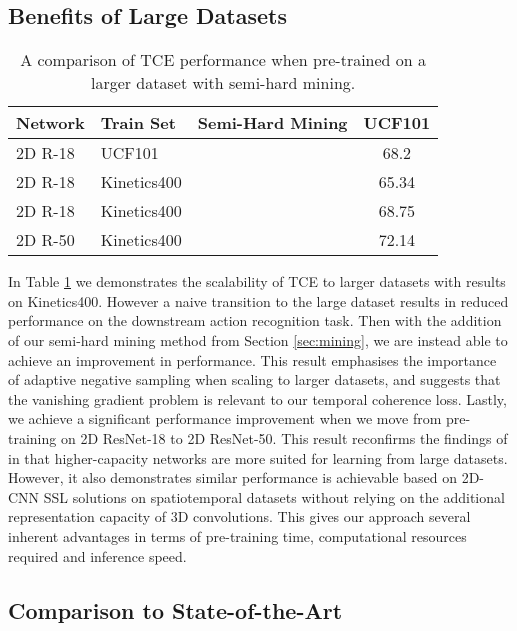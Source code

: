 \documentclass[a4paper,conference]{IEEEtran}
\newcommand{\cmark}{\ding{51}}
\newcommand{\xmark}{\ding{55}}
\begin{document}
\subsection{Benefits of Large Datasets}
\label{sec:Kinetics}
\begin{table}[h]
    \caption{A comparison of TCE performance when pre-trained on a larger dataset with semi-hard mining.}
    \centering
    \begin{tabular}{llc|c}
        \hline \hline 
        \textbf{Network} & \textbf{Train Set} & \textbf{Semi-Hard Mining} & \textbf{UCF101} \\
        \hline \hline 
        2D R-18 & UCF101 & \xmark & 68.2 \\
        \hline 
        2D R-18 & Kinetics400 & \xmark & 65.34 \\
        \hline 
        2D R-18 & Kinetics400 & \cmark & 68.75 \\
        \hline 
        2D R-50 & Kinetics400 & \cmark & 72.14 \\
        \hline 

    \end{tabular}
    \label{tab:scaling}
\end{table}

In Table \ref{tab:scaling} we demonstrates the scalability of TCE to larger datasets with results on Kinetics400. However a naive transition to the large dataset results in reduced performance on the downstream action recognition task. Then with the addition of our semi-hard mining method from Section \ref{sec:mining}, we are instead able to achieve an improvement in performance. This result emphasises the importance of adaptive negative sampling when scaling to larger datasets, and suggests that the vanishing gradient problem is relevant to our temporal coherence loss. Lastly, we achieve a significant performance improvement when we move from pre-training on 2D ResNet-18 to 2D ResNet-50. This result reconfirms the findings of \cite{hara2018can} in that higher-capacity networks are more suited for learning from large datasets. However, it also demonstrates similar performance is achievable based on 2D-CNN SSL solutions on spatiotemporal datasets without relying on the additional representation capacity of 3D convolutions. This gives our approach several inherent advantages in terms of pre-training time, computational resources required and inference speed.

\subsection{Comparison to State-of-the-Art}
    \label{sec:SOA}
    
\end{document}
